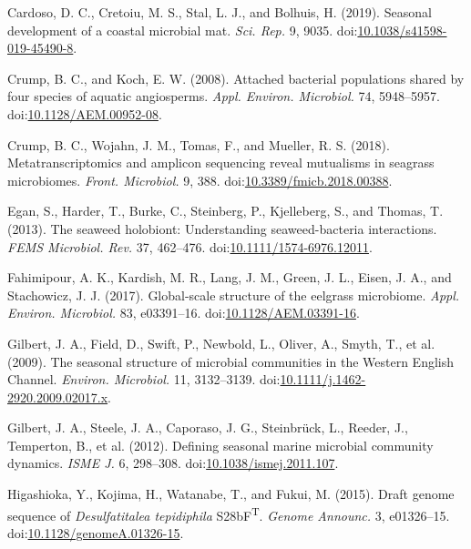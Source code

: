 \documentclass[12pt,]{article}
\begin{document}
\leavevmode\hypertarget{ref-Cardoso2019}{}%
Cardoso, D. C., Cretoiu, M. S., Stal, L. J., and Bolhuis, H. (2019).
Seasonal development of a coastal microbial mat. \emph{Sci. Rep.} 9,
9035.
doi:\href{https://doi.org/10.1038/s41598-019-45490-8}{10.1038/s41598-019-45490-8}.

\leavevmode\hypertarget{ref-Crump2008}{}%
Crump, B. C., and Koch, E. W. (2008). Attached bacterial populations
shared by four species of aquatic angiosperms. \emph{Appl. Environ.
Microbiol.} 74, 5948--5957.
doi:\href{https://doi.org/10.1128/AEM.00952-08}{10.1128/AEM.00952-08}.

\leavevmode\hypertarget{ref-Crump2018}{}%
Crump, B. C., Wojahn, J. M., Tomas, F., and Mueller, R. S. (2018).
Metatranscriptomics and amplicon sequencing reveal mutualisms in
seagrass microbiomes. \emph{Front. Microbiol.} 9, 388.
doi:\href{https://doi.org/10.3389/fmicb.2018.00388}{10.3389/fmicb.2018.00388}.

\leavevmode\hypertarget{ref-Egan2013}{}%
Egan, S., Harder, T., Burke, C., Steinberg, P., Kjelleberg, S., and
Thomas, T. (2013). The seaweed holobiont: Understanding seaweed-bacteria
interactions. \emph{FEMS Microbiol. Rev.} 37, 462--476.
doi:\href{https://doi.org/10.1111/1574-6976.12011}{10.1111/1574-6976.12011}.

\leavevmode\hypertarget{ref-Fahimipour2017}{}%
Fahimipour, A. K., Kardish, M. R., Lang, J. M., Green, J. L., Eisen, J.
A., and Stachowicz, J. J. (2017). Global-scale structure of the eelgrass
microbiome. \emph{Appl. Environ. Microbiol.} 83, e03391--16.
doi:\href{https://doi.org/10.1128/AEM.03391-16}{10.1128/AEM.03391-16}.

\leavevmode\hypertarget{ref-Gilbert2009}{}%
Gilbert, J. A., Field, D., Swift, P., Newbold, L., Oliver, A., Smyth,
T., et al. (2009). The seasonal structure of microbial communities in
the Western English Channel. \emph{Environ. Microbiol.} 11, 3132--3139.
doi:\href{https://doi.org/10.1111/j.1462-2920.2009.02017.x}{10.1111/j.1462-2920.2009.02017.x}.

\leavevmode\hypertarget{ref-Gilbert2012}{}%
Gilbert, J. A., Steele, J. A., Caporaso, J. G., Steinbrück, L., Reeder,
J., Temperton, B., et al. (2012). Defining seasonal marine microbial
community dynamics. \emph{ISME J.} 6, 298--308.
doi:\href{https://doi.org/10.1038/ismej.2011.107}{10.1038/ismej.2011.107}.

\leavevmode\hypertarget{ref-Higashioka2015}{}%
Higashioka, Y., Kojima, H., Watanabe, T., and Fukui, M. (2015). Draft
genome sequence of \emph{Desulfatitalea tepidiphila}
S28bF\textsuperscript{T}. \emph{Genome Announc.} 3, e01326--15.
doi:\href{https://doi.org/10.1128/genomeA.01326-15}{10.1128/genomeA.01326-15}.
\end{document}
